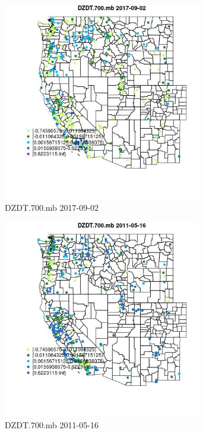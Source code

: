 \begin{figure} 
\centering  
\includegraphics[width=0.77\textwidth]{Code_Outputs/Report_ML_input_PM25_Step4_part_e_de_duplicated_aves_compiled_2019-05-21wNAs_MapObsDZDT700mb2017-09-02.jpg} 
\caption{\label{fig:Report_ML_input_PM25_Step4_part_e_de_duplicated_aves_compiled_2019-05-21wNAsMapObsDZDT700mb2017-09-02}DZDT.700.mb 2017-09-02} 
\end{figure} 
 

\clearpage 

\begin{figure} 
\centering  
\includegraphics[width=0.77\textwidth]{Code_Outputs/Report_ML_input_PM25_Step4_part_e_de_duplicated_aves_compiled_2019-05-21wNAs_MapObsDZDT700mb2011-05-16.jpg} 
\caption{\label{fig:Report_ML_input_PM25_Step4_part_e_de_duplicated_aves_compiled_2019-05-21wNAsMapObsDZDT700mb2011-05-16}DZDT.700.mb 2011-05-16} 
\end{figure} 
 

